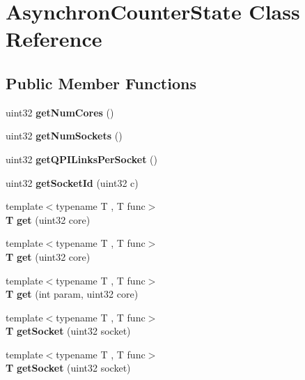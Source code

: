 \section{Asynchron\+Counter\+State Class Reference}
\label{classAsynchronCounterState}
\subsection*{Public Member Functions}
\begin{DoxyCompactItemize}
\item 
uint32 {\bfseries get\+Num\+Cores} ()\label{classAsynchronCounterState_ae50ebd3674b3ba52ff25f46b4eeb3956}

\item 
uint32 {\bfseries get\+Num\+Sockets} ()\label{classAsynchronCounterState_aad5f8ed144ee05d32c4b82e8664ea294}

\item 
uint32 {\bfseries get\+Q\+P\+I\+Links\+Per\+Socket} ()\label{classAsynchronCounterState_ab221a101212adceb2a248691eca8db1a}

\item 
uint32 {\bfseries get\+Socket\+Id} (uint32 c)\label{classAsynchronCounterState_a9121ce142b39fd845f6c4eb101c214bf}

\item 
{\footnotesize template$<$typename T , T  func$>$ }\\{\bf T} {\bfseries get} (uint32 core)\label{classAsynchronCounterState_a8f8e4539b38c5f171faa235b196e6f6a}

\item 
{\footnotesize template$<$typename T , T  func$>$ }\\{\bf T} {\bfseries get} (uint32 core)\label{classAsynchronCounterState_a8f8e4539b38c5f171faa235b196e6f6a}

\item 
{\footnotesize template$<$typename T , T  func$>$ }\\{\bf T} {\bfseries get} (int param, uint32 core)\label{classAsynchronCounterState_aa77c2086bbaa8214dc60176f6ba08e43}

\item 
{\footnotesize template$<$typename T , T  func$>$ }\\{\bf T} {\bfseries get\+Socket} (uint32 socket)\label{classAsynchronCounterState_a272fad1f3bd704f873c9c3a29e95192b}

\item 
{\footnotesize template$<$typename T , T  func$>$ }\\{\bf T} {\bfseries get\+Socket} (uint32 socket)\label{classAsynchronCounterState_a272fad1f3bd704f873c9c3a29e95192b}


\end{DoxyCompactItemize}
